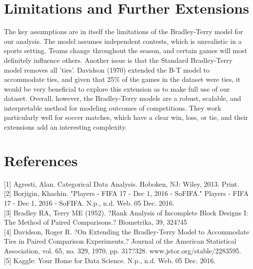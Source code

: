 \documentclass{article}
\begin{document}
\section{Limitations and Further Extensions}

The key assumptions are in itself the limitations of the Bradley-Terry model for our analysis. The model assumes independent contests, which is unrealistic in a sports setting. Teams change throughout the season, and certain games will most definitely influence others. Another issue is that the Standard Bradley-Terry model removes all 'ties'. Davidson (1970) extended the B-T model to accommodate ties, and given that 25\% of the games in the dataset were ties, it would be very beneficial to explore this extension as to make full use of our dataset. Overall, however, the Bradley-Terry models are a robust, scalable, and interpretable method for modeling outcomes of competitions. They work particularly well for soccer matches, which have a clear win, loss, or tie, and their extensions add an interesting complexity.

\section{References}

[1] Agresti, Alan. Categorical Data Analysis. Hoboken, NJ: Wiley, 2013. Print.\\

[2] Borjigin, Khachin. "Players - FIFA 17 - Dec 1, 2016 - SoFIFA." Players - FIFA 17 - Dec 1, 2016 - SoFIFA. N.p., n.d. Web. 05 Dec. 2016.\\

[3] Bradley RA, Terry ME (1952). ?Rank Analysis of Incomplete Block Designs I: The Method
of Paired Comparisons.? Biometrika, 39, 324?45\\

[4] Davidson, Roger R. ?On Extending the Bradley-Terry Model to Accommodate Ties in Paired Comparison Experiments.? Journal of the American Statistical Association, vol. 65, no. 329, 1970, pp. 317?328. www.jstor.org/stable/2283595.\\

[5] Kaggle: Your Home for Data Science. N.p., n.d. Web. 05 Dec. 2016.\\
\end{document}
